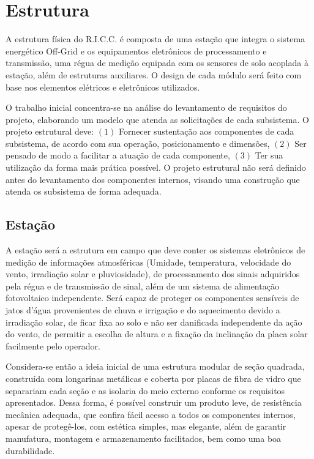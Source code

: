 \chapter[Estrutura]{Estrutura}
	
	A estrutura física do R.I.C.C. é composta de uma estação que integra o sistema energético Off-Grid e os equipamentos eletrônicos de processamento e transmissão, uma régua de medição equipada com os sensores de solo acoplada à estação, além de estruturas auxiliares. O design de cada módulo será feito com base nos elementos elétricos e eletrônicos utilizados.
	
	O trabalho inicial concentra-se na análise do levantamento de requisitos do projeto, elaborando um modelo que atenda as solicitações de cada subsistema. O projeto estrutural deve: $(1)$ Fornecer sustentação aos componentes de cada subsistema, de acordo com sua operação, posicionamento e dimensões, $(2)$ Ser pensado de modo a facilitar a atuação de cada componente, $(3)$ Ter sua utilização da forma mais prática possível. O projeto estrutural não será definido antes do levantamento dos componentes internos, visando uma construção que atenda os subsistema de forma adequada.
	
	\section{Estação}
	
	A estação será a estrutura em campo que deve conter os sistemas eletrônicos de medição de informações atmosféricas (Umidade, temperatura, velocidade do vento, irradiação solar e pluviosidade), de processamento dos sinais adquiridos pela régua e de transmissão de sinal, além de um sistema de alimentação fotovoltaico independente. Será capaz de proteger os componentes sensíveis de jatos d’água provenientes de chuva e irrigação e do aquecimento devido a irradiação solar, de ficar fixa ao solo e não ser danificada independente da ação do vento, de permitir a escolha de altura e a fixação da inclinação da placa solar facilmente pelo operador. 
	
	Considera-se então a ideia inicial de uma estrutura modular de seção quadrada, construída com longarinas metálicas e coberta por placas de fibra de vidro que separariam cada seção e as isolaria do meio externo conforme os requisitos apresentados. Dessa forma, é possível construir um produto leve, de resistência mecânica adequada, que confira fácil acesso a todos os componentes internos, apesar de protegê-los, com estética simples, mas elegante, além de garantir manufatura, montagem e armazenamento facilitados, bem como uma boa durabilidade.
	
